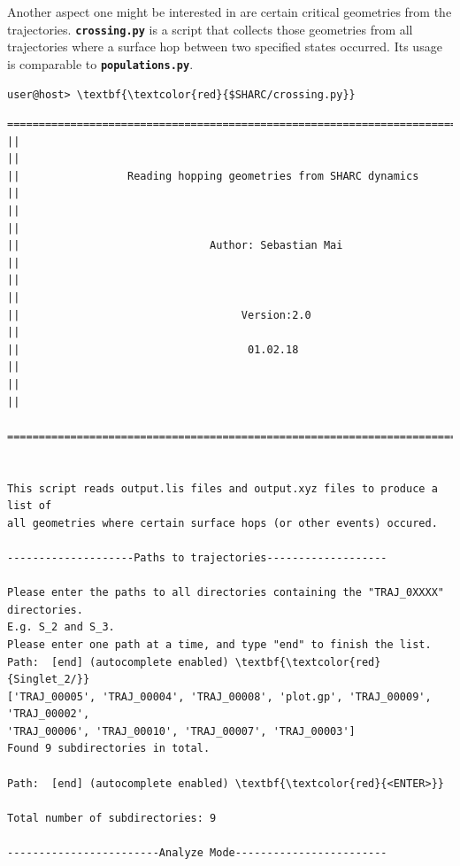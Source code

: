 \documentclass[a4paper,11pt,DIV=15,openany]{scrbook}
\newcommand{\ttt}[1]{\textbf{\texttt{#1}}}
\begin{document}
Another aspect one might be interested in are certain critical geometries from the trajectories.
\ttt{crossing.py} is a script that collects those geometries from all trajectories where a surface hop between two specified states occurred.
Its usage is comparable to \ttt{populations.py}.
\begin{Verbatim}[commandchars=\\\{\}]
user@host> \textbf{\textcolor{red}{$SHARC/crossing.py}}
\end{Verbatim}

\begin{oframed}
\footnotesize\begin{Verbatim}[commandchars=\\\{\}]
  ================================================================================
||                                                                                ||
||                 Reading hopping geometries from SHARC dynamics                 ||
||                                                                                ||
||                              Author: Sebastian Mai                             ||
||                                                                                ||
||                                   Version:2.0                                  ||
||                                    01.02.18                                    ||
||                                                                                ||
  ================================================================================


This script reads output.lis files and output.xyz files to produce a list of
all geometries where certain surface hops (or other events) occured.

--------------------Paths to trajectories-------------------

Please enter the paths to all directories containing the "TRAJ_0XXXX" directories.
E.g. S_2 and S_3.
Please enter one path at a time, and type "end" to finish the list.
Path:  [end] (autocomplete enabled) \textbf{\textcolor{red}{Singlet_2/}}
['TRAJ_00005', 'TRAJ_00004', 'TRAJ_00008', 'plot.gp', 'TRAJ_00009', 'TRAJ_00002', 
'TRAJ_00006', 'TRAJ_00010', 'TRAJ_00007', 'TRAJ_00003']
Found 9 subdirectories in total.

Path:  [end] (autocomplete enabled) \textbf{\textcolor{red}{<ENTER>}}

Total number of subdirectories: 9

------------------------Analyze Mode------------------------


\end{Verbatim}
\end{oframed}
\end{document}
